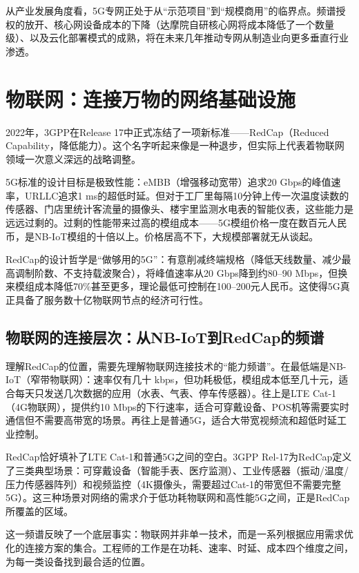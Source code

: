 从产业发展角度看，5G专网正处于从``示范项目''到``规模商用''的临界点。频谱授权的放开、核心网设备成本的下降（达摩院自研核心网将成本降低了一个数量级）、以及云化部署模式的成熟，将在未来几年推动专网从制造业向更多垂直行业渗透。

\section{物联网：连接万物的网络基础设施}

2022年，3GPP在Release 17中正式冻结了一项新标准——RedCap（Reduced Capability，降低能力）。这个名字听起来像是一种退步，但实际上代表着物联网领域一次意义深远的战略调整。

5G标准的设计目标是极致性能：eMBB（增强移动宽带）追求20 Gbps的峰值速率，URLLC追求1 ms的超低时延。但对于工厂里每隔10分钟上传一次温度读数的传感器、门店里统计客流量的摄像头、楼宇里监测水电表的智能仪表，这些能力是远远过剩的。过剩的性能带来过高的模组成本——5G模组价格一度在数百元人民币，是NB-IoT模组的十倍以上。价格居高不下，大规模部署就无从谈起。

RedCap的设计哲学是``做够用的5G''：有意削减终端规格（降低天线数量、减少最高调制阶数、不支持载波聚合），将峰值速率从20 Gbps降到约80--90 Mbps，但换来模组成本降低70\%甚至更多，理论最低可控制在100--200元人民币。这使得5G真正具备了服务数十亿物联网节点的经济可行性。

\subsection{物联网的连接层次：从NB-IoT到RedCap的频谱}

理解RedCap的位置，需要先理解物联网连接技术的``能力频谱''。在最低端是NB-IoT（窄带物联网）：速率仅有几十 kbps，但功耗极低，模组成本低至几十元，适合每天只发送几次数据的应用（水表、气表、停车传感器）。往上是LTE Cat-1（4G物联网），提供约10 Mbps的下行速率，适合可穿戴设备、POS机等需要实时通信但不需要高带宽的场景。再往上是普通5G，适合大带宽视频流和超低时延工业控制。

RedCap恰好填补了LTE Cat-1和普通5G之间的空白。3GPP Rel-17为RedCap定义了三类典型场景：可穿戴设备（智能手表、医疗监测）、工业传感器（振动/温度/压力传感器阵列）和视频监控（4K摄像头，需要超过Cat-1的带宽但不需要完整5G）。这三种场景对网络的需求介于低功耗物联网和高性能5G之间，正是RedCap所覆盖的区域。

这一频谱反映了一个底层事实：物联网并非单一技术，而是一系列根据应用需求优化的连接方案的集合。工程师的工作是在功耗、速率、时延、成本四个维度之间，为每一类设备找到最合适的位置。

